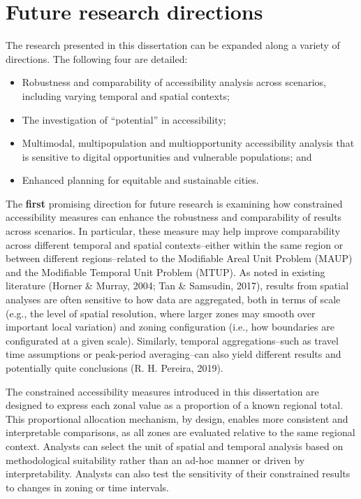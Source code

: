 \documentclass[
11pt, %
oneside, %
english, %
singlespacing, %
]{macthesis} %
\def\tightlist{}
\begin{document}
\section{Future research directions}\label{future-research-directions}

The research presented in this dissertation can be expanded along a variety of directions. The following four are detailed:

\begin{itemize}
\tightlist
\item
  Robustness and comparability of accessibility analysis across scenarios, including varying temporal and spatial contexts;
\item
  The investigation of ``potential'' in accessibility;
\item
  Multimodal, multipopulation and multiopportunity accessibility analysis that is sensitive to digital opportunities and vulnerable populations; and
\item
  Enhanced planning for equitable and sustainable cities.
\end{itemize}

The \textbf{first} promising direction for future research is examining how constrained accessibility measures can enhance the robustness and comparability of results across scenarios. In particular, these measure may help improve comparability across different temporal and spatial contexts--either within the same region or between different regions--related to the Modifiable Areal Unit Problem (MAUP) and the Modifiable Temporal Unit Problem (MTUP). As noted in existing literature (Horner \& Murray, 2004; Tan \& Samsudin, 2017), results from spatial analyses are often sensitive to how data are aggregated, both in terms of scale (e.g., the level of spatial resolution, where larger zones may smooth over important local variation) and zoning configuration (i.e., how boundaries are configurated at a given scale). Similarly, temporal aggregations--such as travel time assumptions or peak-period averaging--can also yield different results and potentially quite conclusions (R. H. Pereira, 2019).

The constrained accessibility measures introduced in this dissertation are designed to express each zonal value as a proportion of a known regional total. This proportional allocation mechanism, by design, enables more consistent and interpretable comparisons, as all zones are evaluated relative to the same regional context. Analysts can select the unit of spatial and temporal analysis based on methodological suitability rather than an ad-hoc manner or driven by interpretability. Analysts can also test the sensitivity of their constrained results to changes in zoning or time intervals.
\end{document}

